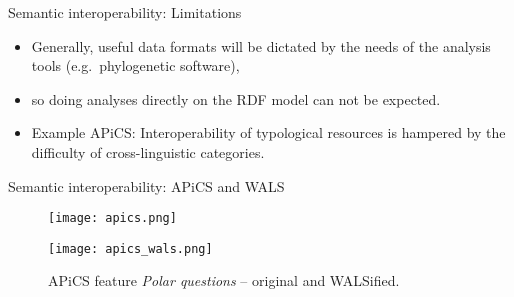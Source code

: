 \documentclass{beamer}
\begin{document}



\begin{frame}{Semantic interoperability: Limitations}

\begin{itemize}

\item Generally, useful data formats will be dictated by the needs of the analysis
tools (e.g.~phylogenetic software),

\item so doing analyses directly on the RDF model can not be expected.

\item Example APiCS: Interoperability of typological resources is hampered by the
difficulty of cross-linguistic categories.

\end{itemize}
\end{frame}


\begin{frame}{Semantic interoperability: APiCS and WALS}
\begin{figure}
\texttt{[image: apics.png]}
\end{figure}

\begin{figure}
\texttt{[image: apics\_wals.png]}
\caption{\label{fig:apics-wals}APiCS feature \emph{Polar questions} -- original and WALSified.}
\end{figure}
\end{frame}
\end{document}
